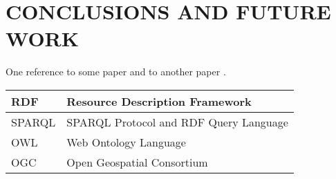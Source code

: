 \documentclass[inscr,ack,preface]{dithesis}
\begin{document}
\frontmatter

\mainmatter















\chapter{CONCLUSIONS AND FUTURE WORK}
  One reference to some paper \cite{manning:corenlp} and to another paper
  \cite{pennington:glove}.

\backmatter

\abbreviations
\begin{center}
	\renewcommand{\arraystretch}{1.5}
	\begin{longtable}{| l | @{\qquad} l |}
	\hline
	RDF    & Resource Description Framework \\
  \hline
	SPARQL & SPARQL Protocol and RDF Query Language \\
  \hline
	OWL    & Web Ontology Language \\
  \hline
	OGC    & Open Geospatial Consortium \\
	\hline
	\end{longtable}
\end{center}
\end{document}
